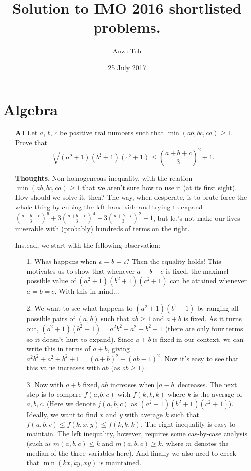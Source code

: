 \documentclass[11pt,a4paper]{article}
\begin{document}
\newcommand{\la}{\leftarrow}
\newcommand{\lra}{\leftrightarrow}


\title{Solution to IMO 2016 shortlisted problems.}
\author{Anzo Teh}
\date{25 July 2017}
\maketitle
\section{Algebra}
\begin{itemize}
\item[\textbf{A1}]
Let $a$, $b$, $c$ be positive real numbers such that $\min(ab,bc,ca) \ge 1$. Prove that $$\sqrt[3]{(a^2+1)(b^2+1)(c^2+1)} \le \left(\frac{a+b+c}{3}\right)^2 + 1.$$

\textbf{Thoughts.} 
Non-homogeneous inequality, with the relation $\min(ab,bc,ca) \ge 1$ that we aren't sure how to use it (at its first sight). 
How should we solve it, then? 
The way, when desperate, is to brute force the whole thing by cubing the left-hand side and trying to expand 
$\left(\frac{a+b+c}{3}\right)^6+3\left(\frac{a+b+c}{3}\right)^4+3\left(\frac{a+b+c}{3}\right)^2+1$, 
but let's not make our lives miserable with (probably) hundreds of terms on the right. 

Instead, we start with the following observation: 
\begin{itemize}
\item [1.] What happens when $a=b=c$? Then the equality holds! 
This motivates us to show that whenever $a+b+c$ is fixed, the maximal possible value of $(a^2+1)(b^2+1)(c^2+1)$ can be attained whenever $a=b=c$. With this in mind...
\item [2.] We want to see what happens to $(a^2+1)(b^2+1)$ by ranging all possible pairs of $(a,b)$ such that $ab\ge 1$ and $a+b$ is fixed. 
As it turns out, $(a^2+1)(b^2+1)=a^2b^2+a^2+b^2+1$ (there are only four terms so it doesn't hurt to expand). 
Since $a+b$ is fixed in our context, we can write this in terms of $a+b$, giving 
$a^2b^2+a^2+b^2+1=(a+b)^2+(ab-1)^2$. 
Now it's easy to see that this value increases with $ab$ (as $ab\ge 1$). 
\item [3.] Now with $a+b$ fixed, $ab$ increases when $|a-b|$ decreases. 
The next step is to compare $f(a,b,c)$ with $f(k,k,k)$ where $k$ is the average of $a,b,c$. 
(Here we denote $f(a,b,c)$ as $(a^2+1)(b^2+1)(c^2+1)$). 
Ideally, we want to find $x$ and $y$ with average $k$ such that 
$f(a,b,c)\le f(k,x,y)\le f(k,k,k)$. 
The right inequality is easy to maintain. 
The left inequality, however, requires some cas-by-case analysis (such as $m(a,b,c)\le k$ and $m(a,b,c)\ge k$, where $m$ denotes the median of the three variables here). 
And finally we also need to check that $\min(kx, ky, xy)$ is maintained.
\end{itemize}


\end{itemize}
\end{document}

